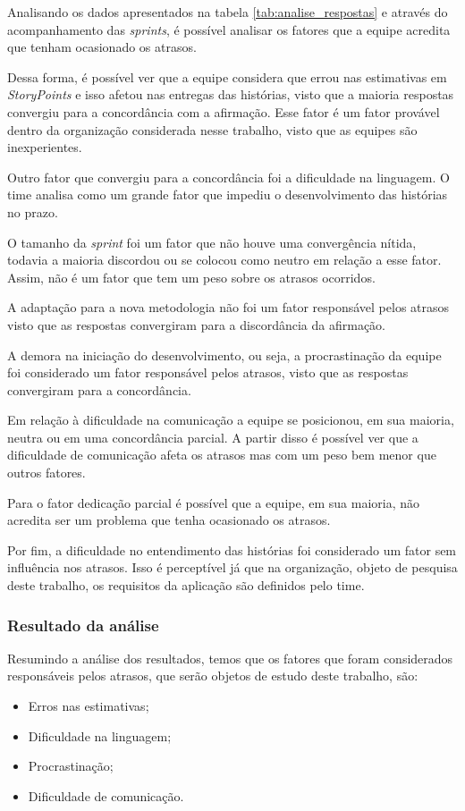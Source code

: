			Analisando os dados apresentados na tabela \ref{tab:analise_respostas} e através do acompanhamento das \textit{sprints}, é possível analisar os fatores que a equipe acredita que tenham ocasionado os atrasos.

			Dessa forma, é possível ver que a equipe considera que errou nas estimativas em \textit{StoryPoints} e isso afetou nas entregas das histórias, visto que a maioria respostas convergiu para a concordância com a afirmação. Esse fator é um fator provável dentro da organização considerada nesse trabalho, visto que as equipes são inexperientes.

			Outro fator que convergiu para a concordância foi a dificuldade na linguagem. O time analisa como um grande fator que impediu o desenvolvimento das histórias no prazo.

			O tamanho da \textit{sprint} foi um fator que não houve uma convergência nítida, todavia a maioria discordou ou se colocou como neutro em relação a esse fator. Assim, não é um fator que tem um peso sobre os atrasos ocorridos.

			A adaptação para a nova metodologia não foi um fator responsável pelos atrasos visto que as respostas convergiram para a discordância da afirmação.

			A demora na iniciação do desenvolvimento, ou seja, a procrastinação da equipe foi considerado um fator responsável pelos atrasos, visto que as respostas convergiram para a concordância.

			Em relação à dificuldade na comunicação a equipe se posicionou, em sua maioria, neutra ou em uma concordância parcial. A partir disso é possível
			ver que a dificuldade de comunicação afeta os atrasos mas com um peso bem menor que outros fatores.

			Para o fator dedicação parcial é possível que a equipe, em sua maioria, não acredita ser um problema que tenha ocasionado os atrasos.

			Por fim, a dificuldade no entendimento das histórias foi considerado um fator sem influência nos atrasos. Isso é perceptível já que na organização, objeto de pesquisa deste trabalho, os requisitos da aplicação são definidos pelo time.

		\subsubsection{Resultado da análise}
			Resumindo a análise dos resultados, temos que os fatores que foram considerados responsáveis pelos atrasos, que serão objetos de estudo deste trabalho, são:

			\begin{itemize}
				\item Erros nas estimativas;
				\item Dificuldade na linguagem;
				\item Procrastinação;
				\item Dificuldade de comunicação.
			\end{itemize}
